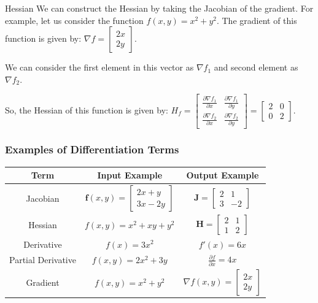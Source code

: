 \documentclass[handout]{beamer}
\begin{document}
\begin{frame}{Hessian}
   We can construct the Hessian by taking the Jacobian of the gradient. For example, let us consider the function $f(x, y) = x^2 + y^2$. The gradient of this function is given by: $\nabla f = \begin{bmatrix} 2x \\ 2y \end{bmatrix}$. 

   We can consider the first element in this vector as $\nabla f_1$ and second element as $\nabla f_2$.

   So, the Hessian of this function is given by: $H_f = \begin{bmatrix} \frac{\partial \nabla f_1}{\partial x} & \frac{\partial \nabla f_1}{\partial y} \\ \frac{\partial \nabla f_2}{\partial x} & \frac{\partial \nabla f_2}{\partial y} \end{bmatrix} = \begin{bmatrix} 2 & 0 \\ 0 & 2 \end{bmatrix}$.


\end{frame}

\begin{frame}
    \frametitle{Examples of Differentiation Terms}
  
    \begin{table}[h]
      \centering
      \begin{tabular}{|c|c|c|}
        \hline
        \textbf{Term} & \textbf{Input Example} & \textbf{Output Example} \\
        \hline
        Jacobian & $\mathbf{f}(x, y) = \begin{bmatrix} 2x + y \\ 3x - 2y \end{bmatrix}$ & $\mathbf{J} = \begin{bmatrix} 2 & 1 \\ 3 & -2 \end{bmatrix}$ \\
        \hline
        Hessian & $f(x, y) = x^2 + xy + y^2$ & $\mathbf{H} = \begin{bmatrix} 2 & 1 \\ 1 & 2 \end{bmatrix}$ \\
        \hline
        Derivative & $f(x) = 3x^2$ & $f'(x) = 6x$ \\
        \hline
        Partial Derivative & $f(x, y) = 2x^2 + 3y$ & $\frac{\partial f}{\partial x} = 4x$ \\
        \hline
        Gradient & $f(x, y) = x^2 + y^2$ & $\nabla f(x, y) = \begin{bmatrix} 2x \\ 2y \end{bmatrix}$ \\
        \hline
      \end{tabular}
    \end{table}
  
  \end{frame}
\end{document}
